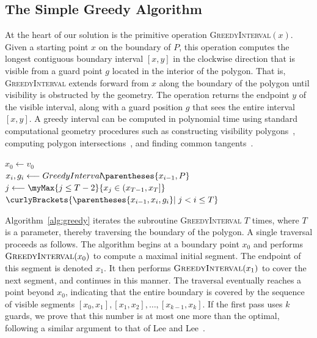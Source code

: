 \subsection{The Simple Greedy Algorithm}
At the heart of our solution is the primitive operation \textsc{GreedyInterval}$(x)$. 
Given a starting point $x$ on the boundary of $P$, this operation computes the longest contiguous boundary interval $[x,y]$ in the clockwise direction that is visible from a guard point $g$ located in the interior of the polygon. 
That is, \textsc{GreedyInterval} extends forward from $x$ along the boundary of the polygon until visibility is obstructed by the geometry. 
The operation returns the endpoint $y$ of the visible interval, along with a guard position $g$ that sees the entire interval $[x,y]$. 
A greedy interval can be computed in polynomial time using standard computational geometry procedures such as constructing visibility polygons~\cite{1675729, ELGINDY1981186}, computing polygon intersections~\cite{10.1145/563858.563896}, and finding common tangents~\cite{10.1145/3284355}. 

\begin{algorithm}[ht]
    \caption{\label{alg:greedy} (Manuscript~\ref{chap:art_gallery} Algorithm~1)}
    $x_0 \longleftarrow v_0$\\
      {
         $x_i, g_i \longleftarrow GreedyInterval\!\parentheses{x_{i - 1}, P}$ \\
    }
     $j \longleftarrow \myMax{j \leq T - 2}{x_j \in \left( x_{T - 1}, x_T \right] }$ \\
    \Return $\curlyBrackets{\parentheses{x_{i - 1}, x_i, g_i} |\; j < i \leq T}$  
\end{algorithm}

Algorithm~\ref{alg:greedy} iterates the subroutine \textsc{GreedyInterval} $T$ times, where $T$ is a parameter, thereby traversing the boundary of the polygon.
A single traversal proceeds as follows. 
The algorithm begins at a boundary point $x_0$ and performs $\textsc{GreedyInterval}(x_0)$ to compute a maximal initial segment. 
The endpoint of this segment is denoted $x_1$. 
It then performs $\textsc{GreedyInterval}(x_1)$ to cover the next segment, and continues in this manner. 
The traversal eventually reaches a point beyond $x_0$, indicating that the entire boundary is covered by the sequence of visible segments $[x_0,x_1], [x_1,x_2], \ldots, [x_{k-1},x_k]$.	 
If the first pass uses $k$ guards, we prove that this number is at most one more than the optimal, following a similar argument to that of Lee and Lee~\cite{LEE1984109}.	 

